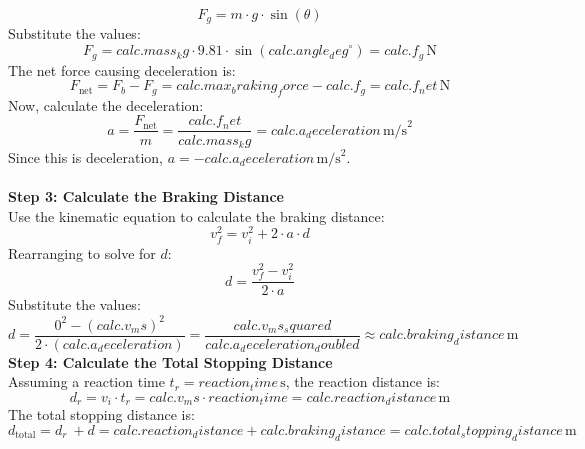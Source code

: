 \documentclass[14pt]{article}
\begin{document}
{{{{{{{{{{{{\[
F_g = m \cdot g \cdot \sin(\theta)
\]  
Substitute the values:
\[
F_g = {{ calc.mass_kg }} \cdot 9.81 \cdot \sin({{ calc.angle_deg }}^\circ) = {{ calc.f_g }} \, \text{N}
\]
The net force causing deceleration is:
\[
F_{\text{net}} = F_b - F_g = {{ calc.max_braking_force }} - {{ calc.f_g }} = {{ calc.f_net }} \, \text{N}
\]
Now, calculate the deceleration:
\[
a = \frac{F_{\text{net}} }{m} = \frac{ {{ calc.f_net }} }{ {{ calc.mass_kg }} } = {{ calc.a_deceleration }} \, \text{m/s}^2
\]
Since this is deceleration, \( a = -{{ calc.a_deceleration }} \, \text{m/s}^2 \).\\
\\
\textbf{Step 3: Calculate the Braking Distance}\\
Use the kinematic equation to calculate the braking distance:\\
\[
v_f^2 = v_i^2 + 2 \cdot a \cdot d
\]
Rearranging to solve for \( d \):\\
\[
d = \frac{v_f^2 - v_i^2}{2 \cdot a}
\]
Substitute the values:\\
\[
d = \frac{0^2 - ({{ calc.v_ms }})^2}{2 \cdot ({{ calc.a_deceleration }})} = \frac{ {{ calc.v_ms_squared }} }{ {{ calc.a_deceleration_doubled }} } \approx {{ calc.braking_distance }} \, \text{m}
\]
\textbf{Step 4: Calculate the Total Stopping Distance}\\
Assuming a reaction time \( t_r = {{ reaction_time }} \, \text{s} \), the reaction distance is:\\
\[
d_r = v_i \cdot t_r = {{ calc.v_ms }} \cdot {{ reaction_time }} = {{ calc.reaction_distance }} \, \text{m}
\]
The total stopping distance is:
\[
d_{\text{total}} = d_r\ + d = {{ calc.reaction_distance }} + {{ calc.braking_distance }} = {{ calc.total_stopping_distance }} \, \text{m}
\]
{%
{%

{%
{%
}}}}}}}}}}}}}}}}
\end{document}
